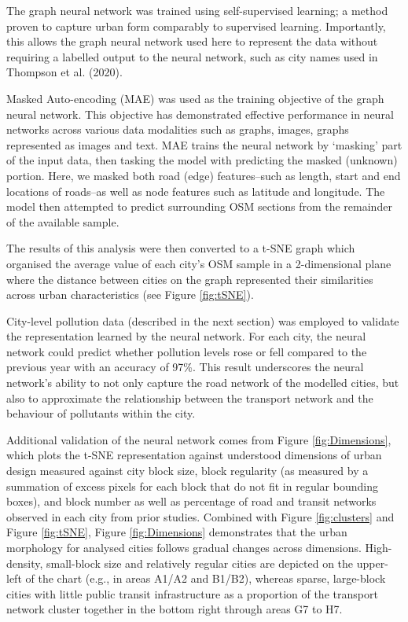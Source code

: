 \documentclass[preprint,12pt]{elsarticle}
\begin{document}
The graph neural network was trained using self-supervised learning; a method proven to capture urban form comparably to supervised learning\cite{seneviratne2021self}. Importantly, this allows the graph neural network used here to represent the data without requiring a labelled output to the neural network, such as city names used in Thompson et al. (2020)\cite{Thompson2020}.

Masked Auto-encoding (MAE) was used as the training objective of the graph neural network. This objective has demonstrated effective performance in neural networks across various data modalities such as graphs\cite{hou2022graphmae}, images\cite{he2022masked}, graphs represented as images\cite{seneviratne2022self} and text\cite{devlin2018bert}. MAE trains the neural network by `masking' part of the input data, then tasking the model with predicting the masked (unknown) portion. Here, we masked both road (edge) features--such as length, start and end locations of roads--as well as node features such as latitude and longitude. The model then attempted to predict surrounding OSM sections from the remainder of the available sample. 

The results of this analysis were then converted to a t-SNE\cite{scikit-learn} graph which organised the average value of each city's OSM sample in a 2-dimensional plane where the distance between cities on the graph represented their similarities across urban characteristics (see Figure \ref{fig:tSNE}).

City-level pollution data (described in the next section) was employed to validate the representation learned by the neural network. For each city, the neural network could predict whether pollution levels rose or fell compared to the previous year with an accuracy of 97\%. This result underscores the neural network's ability to not only capture the road network of the modelled cities, but also to approximate the relationship between the transport network and the behaviour of pollutants within the city.

Additional validation of the neural network comes from Figure \ref{fig:Dimensions}, which plots the t-SNE representation against understood dimensions of urban design measured against city block size, block regularity (as measured by a summation of excess pixels for each block that do not fit in regular bounding boxes), and block number as well as percentage of road and transit networks observed in each city from prior studies\cite{Thompson2020,Nice2019b}. Combined with Figure \ref{fig:clusters} and Figure \ref{fig:tSNE}, Figure \ref{fig:Dimensions} demonstrates that the urban morphology for analysed cities follows gradual changes across dimensions. High-density, small-block size and relatively regular cities are depicted on the upper-left of the chart (e.g., in areas A1/A2 and B1/B2), whereas sparse, large-block cities with little public transit infrastructure as a proportion of the transport network cluster together in the bottom right through areas G7 to H7. 
\end{document}
